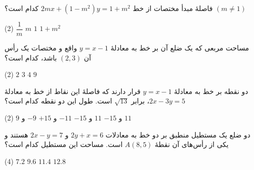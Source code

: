 
\vspace{0.6\baselineskip}

\begin{example}
    فاصلۀ مبدأ مختصات از خط
    \(
        2mx+(1-m^2)y=1+m^2
    \)
    کدام است؟ \((m\ne 1)\)

    \begin{tasks}(2)
        \task \(\dfrac{1}{m}\)
        \task \(m\)
        \task \(1\)
        \task \(1+m^2\)
    \end{tasks}
\end{example}


\vspace{0.2\baselineskip}

\begin{example}
    مساحت مربعی که یک ضلع آن بر خط به معادلۀ
    \(y=x-1\) واقع و مختصات یک رأس آن
    \((2,3)\) باشد، کدام است؟

    \begin{tasks}(2)
        \task \(2\)
        \task \(3\)
        \task \(4\)
        \task \(9\)
    \end{tasks}
\end{example}


\vspace{0.2\baselineskip}

\begin{example}
    دو نقطه بر خط به معادلۀ \(y=x-1\) قرار دارند
    که فاصلۀ این نقاط از خط به معادلۀ
    \(2x-3y=5\)، برابر \(\sqrt{13}\) است.
    طول این دو نقطه کدام است؟

    \begin{tasks}(2)
        \task $9$ و $-15$
        \task $11$ و $-15$
        \task $-11$ و $+15$
        \task $-9$ و $11$
    \end{tasks}
\end{example}


\vspace{0.2\baselineskip}

\begin{example}
    دو ضلع یک مستطیل منطبق بر دو خط به معادلات
    \(2y+x=6\) و \(2x-y=7\) هستند و یکی از
    رأس‌های آن نقطۀ \(A(8,5)\) است.
    مساحت این مستطیل کدام است؟

    \begin{tasks}(4)
        \task \(7.2\)
        \task \(9.6\)
        \task \(11.4\)
        \task \(12.8\)
    \end{tasks}
\end{example}

